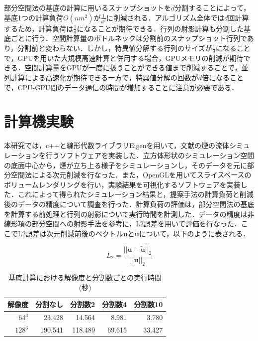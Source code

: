 \documentclass[uplatex,dvipdfmx,10pt,a4paper,notitlepage,oneside,twocolumn]{abst_jsarticle}
\begin{document}
部分空間法の基底の計算に用いるスナップショットを$d$分割することによって，基底1つの計算負荷$O(nm^2)$が$\frac{1}{d^2}$に削減される．アルゴリズム全体では$d$回計算するため，計算負荷は$\frac{1}{d}$になることが期待できる．行列の射影計算も分割した基底ごとに行う．空間計算量のボトルネックは分割前のスナップショット行列であり，分割前と変わらない．しかし，特異値分解する行列のサイズが$\frac{1}{d}$になることで，GPUを用いた大規模高速計算と併用する場合，GPUメモリの削減が期待できる．空間計算量をGPUが一度に扱うことができる値まで削減することで，並列計算による高速化が期待できる一方で，特異値分解の回数が$d$倍になることで，CPU-GPU間のデータ通信の時間が増加することに注意が必要である．

\section{計算機実験}
本研究では，c++と線形代数ライブラリEigenを用いて，文献\cite{fedkiw}の煙の流体シミュレーションを行うソフトウェアを実装した．立方体形状のシミュレーション空間の底面中心から，煙が立ち上る様子をシミュレーションし，そのデータを元に部分空間法による次元削減を行なった．また，OpenGLを用いてスライスベースのボリュームレンダリングを行い，実験結果を可視化するソフトウェアを実装した．これによって得られたシミュレーション結果と，提案手法の計算負荷と削減後のデータの精度について調査を行った．計算負荷の評価は，部分空間法の基底を計算する前処理と行列の射影について実行時間を計測した．データの精度は非線形項の部分空間への射影手法\cite{projection_base}を参考に，L2誤差を用いて評価を行なった．ここでL2誤差は次元削減前後のベクトル$\bm{u}$と$\bm{\tilde{u}}$について，以下のように表される．

\[
L_2 = \frac{|| \bm{u} - \bm{\tilde{u}} ||_2}{||  \bm{u} ||_2}
\]

\begin {table}[htbp]
    \centering
  \caption{基底計算における解像度と分割数ごとの実行時間(秒)}
  \label{tab:basis}
  \begin {tabular}{rrrrr} \hline
    \multicolumn{1}{c}{解像度} 					&\multicolumn{1}{c}{分割なし} 		&\multicolumn{1}{c}{分割数2}			&\multicolumn{1}{c}{分割数4} 		&\multicolumn{1}{c}{分割数10}\\ \hline
    $64^3$ 					& 23.428 			&14.564	 		&8.981	 	&3.780\\
    $128^3$ 				& 190.541 		&118.489 			& 69.615 		&33.427\\ \hline
  \end {tabular}
\end {table}
\end{document}
